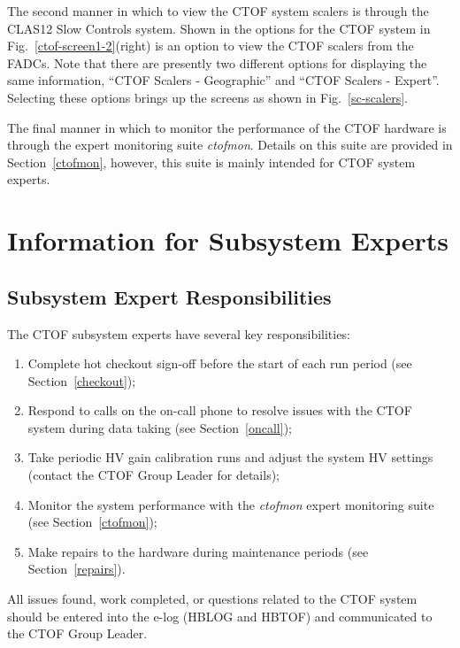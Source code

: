 \documentclass[12pt]{article}
\begin{document}
The second manner in which to view the CTOF system scalers is through the CLAS12 Slow Controls system.
Shown in the options for the CTOF system in Fig.~\ref{ctof-screen1-2}(right) is an option to view the CTOF
scalers from the FADCs. Note that there are presently two different options for displaying the same
information, ``CTOF Scalers - Geographic'' and ``CTOF Scalers - Expert''. Selecting these options brings
up the screens as shown in Fig.~\ref{sc-scalers}.

The final manner in which to monitor the performance of the CTOF hardware is through the expert monitoring
suite {\it ctofmon}. Details on this suite are provided in Section~\ref{ctofmon}, however, this suite is
mainly intended for CTOF system experts.

\clearpage

\vfil
\eject

\section{Information for Subsystem Experts}

\subsection{Subsystem Expert Responsibilities}

The CTOF subsystem experts have several key responsibilities:

\begin{enumerate}
\item Complete hot checkout sign-off before the start of each run period (see Section~\ref{checkout});
\item Respond to calls on the on-call phone to resolve issues with the CTOF system during data taking (see
Section~\ref{oncall});
\item Take periodic HV gain calibration runs and adjust the system HV settings (contact the CTOF Group
Leader for details);
\item Monitor the system performance with the {\it ctofmon} expert monitoring suite (see
Section~\ref{ctofmon});
\item Make repairs to the hardware during maintenance periods (see Section~\ref{repairs}).
\end{enumerate}

All issues found, work completed, or questions related to the CTOF system should be entered into the
e-log (HBLOG and HBTOF) and communicated to the CTOF Group Leader.
\end{document}
